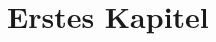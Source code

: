 \documentclass[12pt,a4paper]{scrbook}
\begin{document}
\tableofcontents
\chapter{Erstes Kapitel}
\glsaddall
\renewcommand{\glossaryname}{Glossar} 
\printglossary
\end{document}
